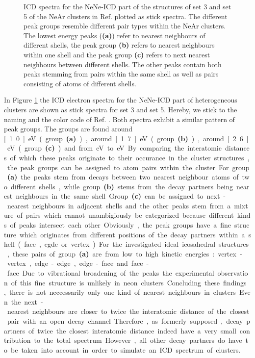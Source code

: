\begin{figure}[h]
 \caption{ICD spectra for the NeNe-ICD part of the structures of set 3 and
          set 5 of the NeAr clusters in Ref. \cite{Fasshauer14_1}
          plotted as stick spectra.
          The different peak groups resemble different pair types
          within the NeAr clusters. The lowest energy peaks (\textbf{(a)})
          refer to nearest neighbours
          of different shells, the peak group \textbf{(b)} refers
          to nearest neighbours within one shell and the peak group \textbf{(c)}
          refers to next nearest neighbours between different shells.
          The other peaks contain both peaks stemming from
          pairs within the same shell as well as pairs consisting of atoms
          of different shells.}
 \label{figure:rot_blue}
\end{figure}

In Figure \ref{figure:rot_blue} the ICD electron spectra for the NeNe-ICD
part of heterogeneous clusters are shown as stick spectra
for set 3 and set 5. Hereby, we stick to the naming and the color code of
Ref. \cite{Fasshauer14_1}. Both spectra exhibit a similar pattern of peak groups.
The groups are found around \unit[1.0]{eV} (group \textbf{(a)}),
around \unit[1.7]{eV} (group \textbf{(b)}), around \unit[2.6]{eV}
(group \textbf{(c)})
and from \unit[3]{eV} to \unit[4]{eV}. By comparing
the interatomic distances of which these peaks originate to their occurance
in the cluster structures, the peak groups can be assigned to atom pairs
within the cluster. For group \textbf{(a)} the peaks stem from decays
between two nearest neighbour atoms of two different shells,
while group \textbf{(b)}
stems from the decay partners being nearest neighbours in the same shell.
Group \textbf{(c)} can be assigned to next-nearest neighbours in adjacent shells
and the other peaks stem from a mixture of pairs which cannot unambigiously
be categorized because different kinds of peaks intersect each other.

Obviously, the peak groups have a fine structure which originates from
different positions of the decay partners within a shell (face, egde or vertex).
For the investigated ideal icosahedral structures,
these pairs of group \textbf{(a)}
are from low to high kinetic energies: vertex-vertex, edge-edge, edge-face and
face-face. Due to vibrational broadening of the peaks the experimental observation
of this fine structure is unlikely in neon clusters.

Concluding these findings, there is not neccessarily only one kind of nearest
neighbours in clusters. Even the next-nearest neighbours are closer to
twice the interatomic distance of the closest pair with an open decay channel.
Therefore, as formerly supposed, decay partners of twice the closest interatomic
distance indeed have a very small contribution to the total spectrum. However,
all other decay partners do have to be taken into account in order to simulate
an ICD spectrum of clusters.


